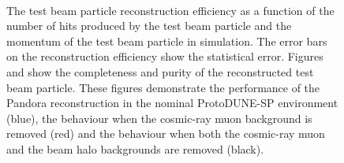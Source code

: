 \begin{figure}
\centering
{}
 \\
\caption{The test beam particle reconstruction efficiency as a function of \protect{} the number of hits produced by the test beam particle and \protect{} the momentum of the test beam particle in simulation.  The error bars on the reconstruction efficiency show the statistical error.  Figures \protect{} and \protect{} show the completeness and purity of the reconstructed test beam particle.  These figures demonstrate the performance of the Pandora reconstruction in the nominal ProtoDUNE-SP environment (blue), the behaviour when the cosmic-ray muon background is removed (red) and the behaviour when both the cosmic-ray muon and the beam halo backgrounds are removed (black).}
\label{fig:tbrecoeffbrkdwn}
\end{figure}

